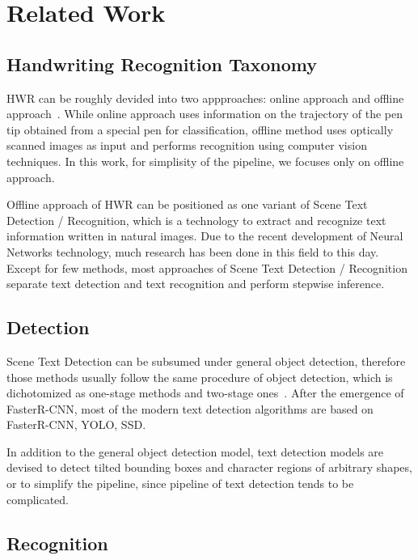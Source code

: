 \section{Related Work}
\label{section:related-work}

\subsection{Handwriting Recognition Taxonomy}

HWR can be roughly devided into two appproaches:
online approach and offline approach~\cite{plamondon2000online}.
While online approach uses information on the trajectory of the pen tip
obtained from a special pen for classification, offline method uses
optically scanned images as input and performs recognition using computer vision techniques.
In this work, for simplisity of the pipeline, we focuses only on offline approach.

Offline approach of HWR can be positioned as one variant of Scene Text Detection / Recognition, which
is a technology to extract and recognize text information written in natural images.
Due to the recent development of Neural Networks technology,
much research has been done in this field to this day.
Except for few methods\cite{liu2018fots}\cite{lyu2018mask}, most approaches of Scene Text Detection / Recognition
separate text detection and text recognition and perform stepwise inference.

\subsection{Detection}

Scene Text Detection can be subsumed under general object detection, therefore those methods usually follow
the same procedure of object detection, which is dichotomized as one-stage methods and two-stage ones~\cite{liu2018deep}.
After the emergence of FasterR-CNN\cite{ren2015faster}, most of the modern text detection algorithms
are based on FasterR-CNN, YOLO\cite{redmon2016you}, SSD\cite{liu2016ssd}.

In addition to the general object detection model, text detection models are devised to detect
tilted bounding boxes\cite{zhou2017east}\cite{jiang2017r2cnn} and character regions of arbitrary shapes\cite{zhang2019look},
or to simplify the pipeline\cite{he2017single}, since pipeline of text detection tends to be complicated\cite{liu2018deep}.

\subsection{Recognition}

